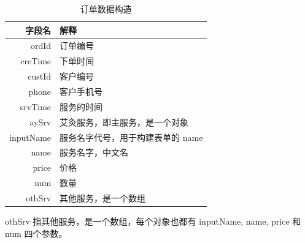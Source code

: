         \begin{table}[htbp]
          \caption{订单数据构造}
          \label{tab:orderdata}
          \centering

          \begin{tabular}{rl}
          \toprule
          字段名 & 解释 \\
          \midrule
          ordId     & 订单编号 \\
          creTime   & 下单时间 \\
          custId    & 客户编号 \\
          phone     & 客户手机号 \\
          srvTime   & 服务的时间 \\
          aySrv     & 艾灸服务，即主服务，是一个对象 \\
          inputName & 服务名字代号，用于构建表单的 name \\
          name      & 服务名字，中文名 \\
          price     & 价格 \\
          num       & 数量 \\
          othSrv    & 其他服务，是一个数组\\
          \bottomrule
          \end{tabular}
        \end{table}

        othSrv 指其他服务，是一个数组，每个对象也都有 inputName, name, price 和 num 四个参数。

